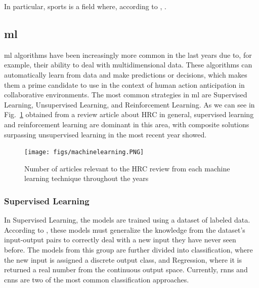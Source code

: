 In particular, sports is a field where, according to \textcite{Smith2016}, .

\subsection{\acf{ml}}

\acl{ml} algorithms have been increasingly more common in the last years due to, for example, their ability to deal with multidimensional data. These algorithms can automatically learn from data and make predictions or decisions, which makes them a prime candidate to use in the context of human action anticipation in collaborative environments. The most common strategies in \acs{ml} are Supervised Learning, Unsupervised Learning, and Reinforcement Learning. As we can see in Fig.~\ref{machinelearning} obtained from a review article about HRC in general, supervised learning and reinforcement learning are dominant in this area, with composite solutions surpassing unsupervised learning in the most recent year showed.

\begin{figure}[!ht]
\centerline{\texttt{[image: figs/machinelearning.PNG]}}
\caption{Number of articles relevant to the HRC review from each machine learning technique throughout the years\cite{Semeraro2023}}
\label{machinelearning}
\end{figure}
\fi

\subsubsection{Supervised Learning}

In Supervised Learning, the models are trained using a dataset of labeled data. According to \textcite{Sarker2021}, these models must generalize the knowledge from the dataset's input-output pairs to correctly deal with a new input they have never seen before. The models from this group are further divided into classification, where the new input is assigned a discrete output class, and Regression, where it is returned a real number from the continuous output space. Currently, \acs{rnn}s and \acs{cnn}s are two of the most common classification approaches.

